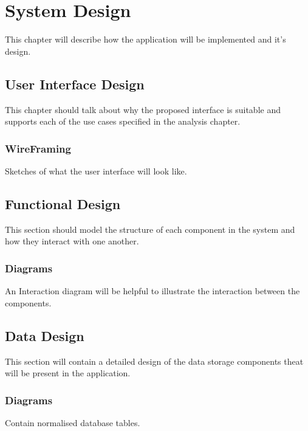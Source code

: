 \chapter{System Design}
This chapter will describe how the application will be implemented and it's design.


\section{User Interface Design}
This chapter should talk about why the proposed interface is suitable and supports each of the use cases specified in the analysis chapter.

\subsection{WireFraming}
Sketches of what the user interface will look like.

\section{Functional Design}
This section should model the structure of each component in the system and how they interact with one another.

\subsection{Diagrams}
An Interaction diagram will be helpful to illustrate the interaction between the components. 

\section{Data Design}
This section will contain a detailed design of the data storage components theat will be present in the application.

\subsection{Diagrams}
Contain normalised database tables.